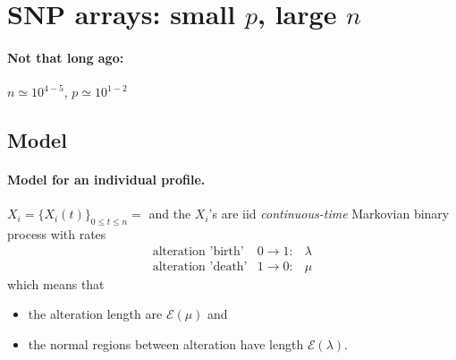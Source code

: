 \documentclass[a4paper,12pt]{article}
\newcommand{\Ecal}{\mathcal{E}}
\begin{document}
\newpage
\section{SNP arrays: small $p$, large $n$ \label{sec:Np}}

\paragraph{Not that long ago:} $n \simeq 10^{4-5}$, $p \simeq 10^{1-2}$


\subsection{Model}

\paragraph{Model for an individual profile.} $X_i = \{X_i(t)\}_{0 \leq t \leq n} =$ and the $X_i$'s are iid {\sl continuous-time} Markovian binary process with rates
\begin{equation} \label{Eq:XiBD}
\begin{array}{lll}
\text{alteration 'birth'} & 0 \rightarrow 1: & \lambda \\
\text{alteration 'death'} & 1 \rightarrow 0: & \mu
\end{array}
\end{equation}
which means that 
\begin{itemize}
 \item the alteration length are $\Ecal(\mu)$ and 
 \item the normal regions between alteration have length $\Ecal(\lambda)$.
\end{itemize}
\end{document}
